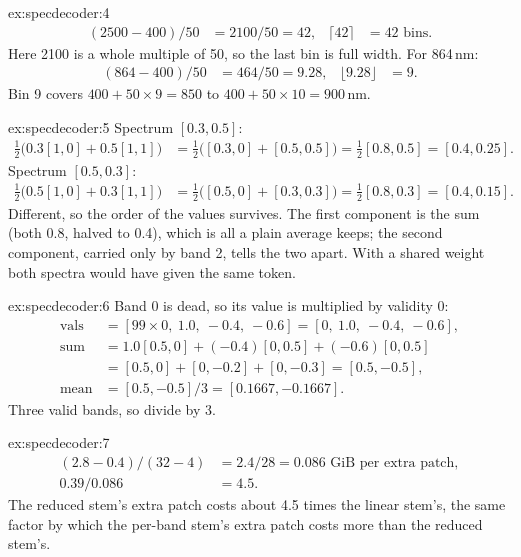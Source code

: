 \begin{solution}{ex:specdecoder:4}
\begin{align*}
  (2500 - 400)/50 &= 2100/50 = 42, & \lceil 42\rceil &= 42 \text{ bins}.
\end{align*}
Here 2100 is a whole multiple of 50, so the last bin is full width. For 864\,nm:
\begin{align*}
  (864 - 400)/50 &= 464/50 = 9.28, & \lfloor 9.28\rfloor &= 9 .
\end{align*}
Bin 9 covers $400 + 50\times9 = 850$ to $400 + 50\times10 = 900$\,nm.
\end{solution}

\begin{solution}{ex:specdecoder:5}
Spectrum $[0.3, 0.5]$:
\begin{align*}
  \tfrac12\bigl(0.3[1, 0] + 0.5[1, 1]\bigr) &= \tfrac12\bigl([0.3, 0] + [0.5, 0.5]\bigr) = \tfrac12[0.8, 0.5] = [0.4, 0.25].
\end{align*}
Spectrum $[0.5, 0.3]$:
\begin{align*}
  \tfrac12\bigl(0.5[1, 0] + 0.3[1, 1]\bigr) &= \tfrac12\bigl([0.5, 0] + [0.3, 0.3]\bigr) = \tfrac12[0.8, 0.3] = [0.4, 0.15].
\end{align*}
Different, so the order of the values survives. The first component is the sum (both 0.8, halved to 0.4), which is all a plain average keeps; the second component, carried only by band 2, tells the two apart. With a shared weight both spectra would have given the same token.
\end{solution}

\begin{solution}{ex:specdecoder:6}
Band 0 is dead, so its value is multiplied by validity 0:
\begin{align*}
  \text{vals} &= [99\times0,\ 1.0,\ -0.4,\ -0.6] = [0,\ 1.0,\ -0.4,\ -0.6],\\
  \text{sum} &= 1.0[0.5, 0] + (-0.4)[0, 0.5] + (-0.6)[0, 0.5]\\
  &= [0.5, 0] + [0, -0.2] + [0, -0.3] = [0.5, -0.5],\\
  \text{mean} &= [0.5, -0.5]/3 = [0.1667, -0.1667] .
\end{align*}
Three valid bands, so divide by 3.
\end{solution}

\begin{solution}{ex:specdecoder:7}
\begin{align*}
  (2.8 - 0.4)/(32 - 4) &= 2.4/28 = 0.086 \text{ GiB per extra patch},\\
  0.39/0.086 &= 4.5 .
\end{align*}
The reduced stem's extra patch costs about 4.5 times the linear stem's, the same factor by which the per-band stem's extra patch costs more than the reduced stem's.
\end{solution}
